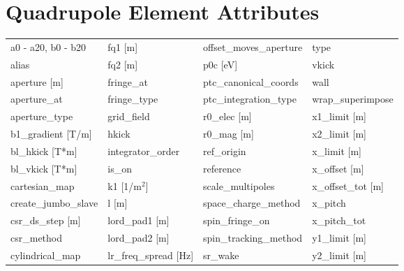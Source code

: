  \section{Quadrupole Element Attributes}
 \label{s:list.quadrupole}
 
 \begin{tabular}{llll} \toprule
a0 - a20, b0 - b20               & fq1 [m]                          & offset_moves_aperture            & type                             \\
alias                            & fq2 [m]                          & p0c [eV]                         & vkick                            \\
aperture [m]                     & fringe_at                        & ptc_canonical_coords             & wall                             \\
aperture_at                      & fringe_type                      & ptc_integration_type             & wrap_superimpose                 \\
aperture_type                    & grid_field                       & r0_elec [m]                      & x1_limit [m]                     \\
b1_gradient [T/m]                & hkick                            & r0_mag [m]                       & x2_limit [m]                     \\
bl_hkick [T*m]                   & integrator_order                 & ref_origin                       & x_limit [m]                      \\
bl_vkick [T*m]                   & is_on                            & reference                        & x_offset [m]                     \\
cartesian_map                    & k1 [1/m$^2$]                     & scale_multipoles                 & x_offset_tot [m]                 \\
create_jumbo_slave               & l [m]                            & space_charge_method              & x_pitch                          \\
csr_ds_step [m]                  & lord_pad1 [m]                    & spin_fringe_on                   & x_pitch_tot                      \\
csr_method                       & lord_pad2 [m]                    & spin_tracking_method             & y1_limit [m]                     \\
cylindrical_map                  & lr_freq_spread [Hz]              & sr_wake                          & y2_limit [m]                     \\

\end{tabular}
